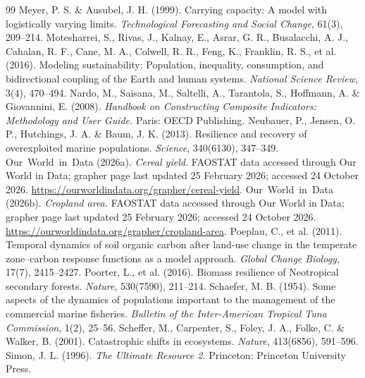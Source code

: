 \documentclass[preprint,12pt,authoryear]{elsarticle}
\begin{document}
\begin{thebibliography}{99}
 Meyer, P. S. \& Ausubel, J. H. (1999). Carrying capacity: A model with logistically varying limits. \emph{Technological Forecasting and Social Change}, 61(3), 209--214.
 Motesharrei, S., Rivas, J., Kalnay, E., Asrar, G. R., Busalacchi, A. J., Cahalan, R. F., Cane, M. A., Colwell, R. R., Feng, K., Franklin, R. S., et al. (2016). Modeling sustainability: Population, inequality, consumption, and bidirectional coupling of the Earth and human systems. \emph{National Science Review}, 3(4), 470--494.
 Nardo, M., Saisana, M., Saltelli, A., Tarantola, S., Hoffmann, A. \& Giovannini, E. (2008). \emph{Handbook on Constructing Composite Indicators: Methodology and User Guide.} Paris: OECD Publishing.
 Neubauer, P., Jensen, O. P., Hutchings, J. A. \& Baum, J. K. (2013). Resilience and recovery of overexploited marine populations. \emph{Science}, 340(6130), 347--349.
 Our~World~in~Data (2026a). \emph{Cereal yield.} FAOSTAT data accessed through Our World in Data; grapher page last updated 25 February 2026; accessed 24 October 2026. \url{https://ourworldindata.org/grapher/cereal-yield}.
 Our~World~in~Data (2026b). \emph{Cropland area.} FAOSTAT data accessed through Our World in Data; grapher page last updated 25 February 2026; accessed 24 October 2026. \url{https://ourworldindata.org/grapher/cropland-area}.
 Poeplau, C., et al. (2011). Temporal dynamics of soil organic carbon after land-use change in the temperate zone--carbon response functions as a model approach. \emph{Global Change Biology}, 17(7), 2415--2427.
 Poorter, L., et al. (2016). Biomass resilience of Neotropical secondary forests. \emph{Nature}, 530(7590), 211--214.
 Schaefer, M. B. (1954). Some aspects of the dynamics of populations important to the management of the commercial marine fisheries. \emph{Bulletin of the Inter-American Tropical Tuna Commission}, 1(2), 25--56.
 Scheffer, M., Carpenter, S., Foley, J. A., Folke, C. \& Walker, B. (2001). Catastrophic shifts in ecosystems. \emph{Nature}, 413(6856), 591--596.
 Simon, J. L. (1996). \emph{The Ultimate Resource 2.} Princeton: Princeton University Press.

\end{thebibliography}
\end{document}
